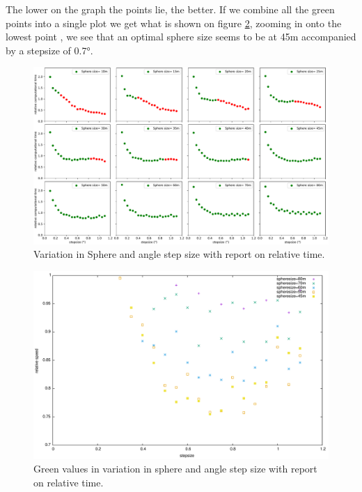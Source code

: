 \documentclass[11pt,a4paper,faculty=we,language=en,doctype=report]{cls/ugent-doc}
\begin{document}
The lower on the graph the points lie, the better. If we combine all the green points into a single plot
we get what is shown on figure \ref{fig:SphereStepFinal},
zooming in onto the lowest point , we see that an optimal sphere size seems to be at 45m accompanied
by a stepsize of 0.7°.
\begin{figure}
	\includegraphics[width=\textwidth]{figures/subplotofallstepsphere.pdf}
	\caption{Variation in Sphere and angle step size with report on relative time.}
	\label{fig:SphereStepInfl}
\end{figure}
\begin{figure}
	\includegraphics[width=\textwidth]{figures/SphereAndStepFinal.pdf}
	\caption{Green values in variation in sphere and angle step size with report on relative time.}
	\label{fig:SphereStepFinal}
\end{figure}
\end{document}
